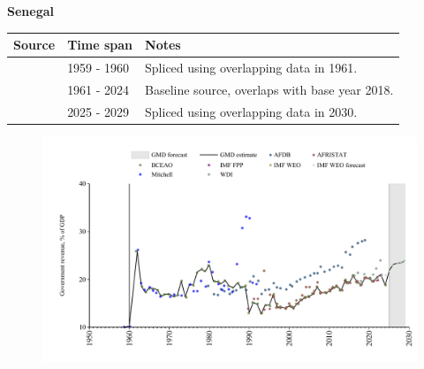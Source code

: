 \documentclass[12pt,a4paper,landscape]{article}
\begin{document}
\begin{adjustbox}{max totalsize={\paperwidth}{\paperheight},center}
\begin{minipage}[t][\textheight][t]{\textwidth}
\vspace*{0.5cm}
{}
\begin{center}
{\Large\bfseries Senegal}
\end{center}
\vspace{0.5cm}
\begin{table}[H]
\centering
\small
\begin{tabular}{|l|l|l|}
\hline
\textbf{Source} & \textbf{Time span} & \textbf{Notes} \\
\hline
\rowcolor{white}\cite{Mitchell}& 1959 - 1960 &Spliced using overlapping data in 1961.\\
\rowcolor{lightgray}\cite{BCEAO}& 1961 - 2024 &Baseline source, overlaps with base year 2018.\\
\rowcolor{white}\cite{IMF_WEO_forecast}& 2025 - 2029 &Spliced using overlapping data in 2030.\\
\hline
\end{tabular}
\end{table}
\begin{figure}[H]
\centering
\includegraphics[width=\textwidth,height=0.6\textheight,keepaspectratio]{graphs/SEN_govrev_GDP.pdf}
\end{figure}
\end{minipage}
\end{adjustbox}
\end{document}
